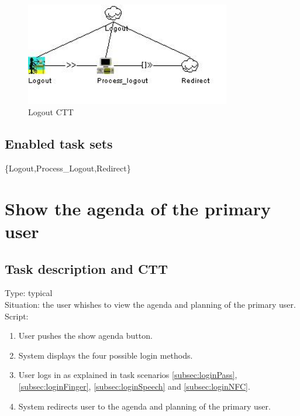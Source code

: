 \documentclass[11pt, a4paper,svglistings]{report}
\begin{document}
\begin{figure}[H]
\centering
    \includegraphics[width=0.8\textwidth]{Logout.jpg}
  \caption[Logout CTT]{\label{fig:Logout}Logout CTT}
\end{figure}

\subsection{Enabled task sets}

\{Logout,Process\_Logout,Redirect\}


\newpage

\section{Show the agenda of the primary user}

\subsection{Task description and CTT}

\label{subsec:agenda}Type: typical \\
Situation: the user whishes to view  the agenda and planning of the primary user. \\
Script:
\begin{enumerate}
\item User pushes the show agenda button.
\item System displays the four possible login methods.
\item User logs in as explained in task scenarios \ref{subsec:loginPass}, \ref{subsec:loginFinger}, \ref{subsec:loginSpeech} and \ref{subsec:loginNFC}.
\item System redirects user to the agenda and planning of the primary user.
\end{enumerate}
\end{document}
